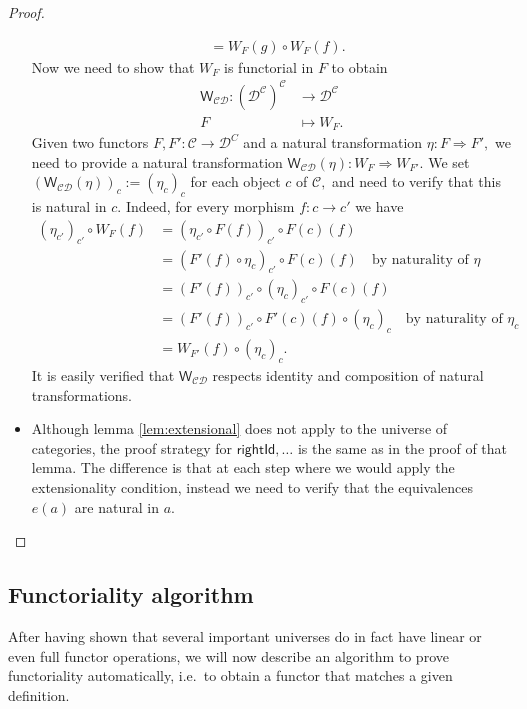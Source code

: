 \documentclass[a4paper]{article}
\theoremstyle{definition}
\theoremstyle{remark}
\newcommand{\C}{\mathcal{C}}
\newcommand{\D}{\mathcal{D}}
\newcommand{\nm}{\mathsf}
\newcommand{\combinator}{\nm}
\newcommand{\dupFun}{\combinator{W}}
\begin{document}
\begin{proof}
\begin{itemize}
\begin{align*}
                     &= W_F(g) \circ W_F(f).
    \end{align*}
    Now we need to show that $W_F$ is functorial in $F$ to obtain
    \begin{align*}
      \dupFun_{\C\D} : (\D^\C)^\C &\to     \D^\C\\
                       F          &\mapsto W_F.
    \end{align*}
    Given two functors $F,F' : \C \to \D^C$ and a natural transformation
    $\eta : F \Rightarrow F',$ we need to provide a natural transformation
    $\dupFun_{\C\D}(\eta) : W_F \Rightarrow W_{F'}.$ We set
    $(\dupFun_{\C\D}(\eta))_c := (\eta_c)_c$ for each object $c$ of $\C,$
    and need to verify that this is natural in $c.$ Indeed, for every
    morphism $f : c \to c'$ we have
    \begin{align*}
      (\eta_{c'})_{c'} \circ W_F(f) &= (\eta_{c'} \circ F(f))_{c'} \circ F(c)(f)\\
                                    &= (F'(f) \circ \eta_c)_{c'} \circ F(c)(f) \quad \text{by naturality of $\eta$}\\
                                    &= (F'(f))_{c'} \circ (\eta_c)_{c'} \circ F(c)(f)\\
                                    &= (F'(f))_{c'} \circ F'(c)(f) \circ (\eta_c)_c \quad \text{by naturality of $\eta_c$}\\
                                    &= W_{F'}(f) \circ (\eta_c)_c.
    \end{align*}
    It is easily verified that $\dupFun_{\C\D}$ respects identity and
    composition of natural transformations.
    \item Although lemma \ref{lem:extensional} does not apply to the universe of
    categories, the proof strategy for $\nm{rightId},\ldots$ is the same
    as in the proof of that lemma. The difference is that at each step where we
    would apply the extensionality condition, instead we need to verify that the
    equivalences $e(a)$ are natural in $a.$ \qedhere
  \end{itemize}
\end{proof}

\subsection{Functoriality algorithm}

After having shown that several important universes do in fact have linear or even full
functor operations, we will now describe an algorithm to prove functoriality
automatically, i.e.\ to obtain a functor that matches a given definition.
\end{document}
